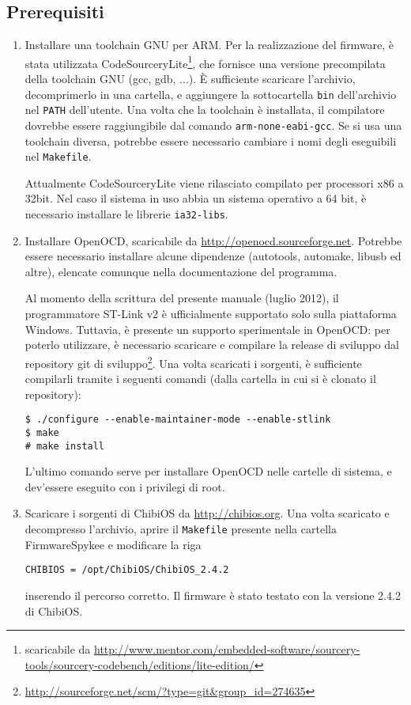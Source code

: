 \subsection*{Prerequisiti}
\begin{enumerate}
\item Installare una toolchain GNU per ARM. Per la realizzazione del firmware, è stata utilizzata  CodeSourceryLite\footnote{scaricabile da \url{http://www.mentor.com/embedded-software/sourcery-tools/sourcery-codebench/editions/lite-edition/}}, che fornisce una versione precompilata della toolchain GNU (gcc, gdb, ...). È sufficiente scaricare l'archivio, decomprimerlo in una cartella, e aggiungere la sottocartella \verb|bin| dell'archivio nel \verb|PATH| dell’utente. Una volta che la toolchain è installata, il compilatore dovrebbe essere raggiungibile dal comando \verb|arm-none-eabi-gcc|. Se si usa una toolchain diversa, potrebbe essere necessario cambiare i nomi degli eseguibili nel \verb|Makefile|.

\begin{nota}
Attualmente CodeSourceryLite viene rilasciato compilato per processori x86 a 32bit. Nel caso il sistema in uso abbia un sistema operativo a 64 bit, è necessario installare le librerie \verb|ia32-libs|.
\end{nota}

\item Installare OpenOCD, scaricabile da \url{http://openocd.sourceforge.net}. Potrebbe essere necessario installare alcune dipendenze (autotools, automake, libusb ed altre), elencate comunque nella documentazione del programma.

\begin{nota}
Al momento della scrittura del presente manuale (luglio 2012), il programmatore ST-Link v2 è ufficialmente supportato solo sulla piattaforma Windows. Tuttavia, è presente un supporto sperimentale in OpenOCD: per poterlo utilizzare, è necessario scaricare e compilare la release di sviluppo dal repository git di sviluppo\footnote{\url{http://sourceforge.net/scm/?type=git&group_id=274635}}. Una volta scaricati i sorgenti, è sufficiente compilarli tramite i seguenti comandi  (dalla cartella in cui si è clonato il repository):
\begin{verbatim}
$ ./configure --enable-maintainer-mode --enable-stlink
$ make
# make install
\end{verbatim}
L'ultimo comando serve per installare OpenOCD nelle cartelle di sistema, e dev'essere eseguito con i privilegi di root.
\end{nota}

\item Scaricare i sorgenti di ChibiOS da \url{http://chibios.org}. Una volta scaricato e decompresso l'archivio, aprire il \verb|Makefile| presente nella cartella FirmwareSpykee e modificare la riga
\begin{verbatim}
CHIBIOS = /opt/ChibiOS/ChibiOS_2.4.2
\end{verbatim}
inserendo il percorso corretto. Il firmware è stato testato con la versione 2.4.2 di ChibiOS.
\end{enumerate}

